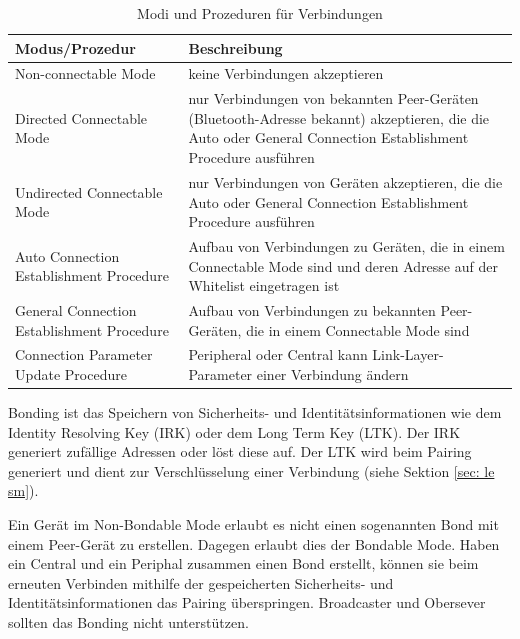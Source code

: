 \begin{table}
    \begin{tabularx}{\textwidth}{|p{4.5cm}|X|}
    \hline
    \textbf{Modus/Prozedur} & \textbf{Beschreibung} \\
    \hline
    Non-connectable Mode & keine Verbindungen akzeptieren \\
    \hline
    Directed Connectable Mode & nur Verbindungen von bekannten Peer-Geräten (Bluetooth-Adresse bekannt) akzeptieren, die die Auto oder General Connection Establishment Procedure ausführen \\
    \hline
    Undirected Connectable Mode & nur Verbindungen von Geräten akzeptieren, die die Auto oder General Connection Establishment Procedure ausführen \\
    \hline
    Auto Connection Establishment Procedure & Aufbau von Verbindungen zu Geräten, die in einem Connectable Mode sind und deren Adresse auf der Whitelist eingetragen ist \\
    \hline
    General Connection Establishment Procedure & Aufbau von Verbindungen zu bekannten Peer-Geräten, die in einem Connectable Mode sind \\
    \hline
    Connection Parameter Update Procedure & Peripheral oder Central kann Link-Layer-Parameter einer Verbindung ändern \\
    \hline
    \end{tabularx}
    \caption[Modi und Prozeduren für Verbindungen (GAP)]{Modi und Prozeduren für Verbindungen \cite{BtSpec4.0_1704-1718}}
    \label{tab: modi prodzeduren gap}
\end{table}

Bonding ist das Speichern von Sicherheits- und Identitätsinformationen wie dem Identity Resolving Key (IRK) oder dem Long Term Key (LTK). Der IRK generiert zufällige Adressen oder löst diese auf. Der LTK wird beim Pairing generiert und dient zur Verschlüsselung einer Verbindung (siehe Sektion \ref{sec: le sm}).

Ein Gerät im Non-Bondable Mode erlaubt es nicht einen sogenannten Bond mit einem Peer-Gerät zu erstellen. Dagegen erlaubt dies der Bondable Mode. Haben ein Central und ein Periphal zusammen einen Bond erstellt, können sie beim erneuten Verbinden mithilfe der gespeicherten Sicherheits- und Identitätsinformationen das Pairing überspringen. Broadcaster und Obersever sollten das Bonding nicht unterstützen. \cite{BtSpec4.2_2060-2062}

